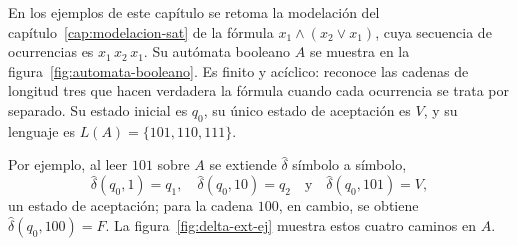 En los ejemplos de este capítulo se retoma la modelación del
capítulo~\ref{cap:modelacion-sat} de la fórmula
$x_1 \wedge (x_2 \vee x_1)$, cuya secuencia de ocurrencias es
$x_1\,x_2\,x_1$. Su autómata booleano $A$ se muestra en la
figura~\ref{fig:automata-booleano}. Es finito y acíclico: reconoce las
cadenas de longitud tres que hacen verdadera la fórmula cuando cada
ocurrencia se trata por separado. Su estado inicial es $q_0$, su único
estado de aceptación es $V$, y su lenguaje es $L(A) = \{101, 110, 111\}$.

Por ejemplo, al leer $101$ sobre $A$ se extiende $\hat\delta$ símbolo a
símbolo,
\[
  \hat\delta(q_0, 1) = q_1, \quad \hat\delta(q_0, 10) = q_2 \quad\text{y}\quad
  \hat\delta(q_0, 101) = V,
\]
un estado de aceptación; para la cadena $100$, en cambio, se obtiene
$\hat\delta(q_0, 100) = F$. La figura~\ref{fig:delta-ext-ej} muestra
estos cuatro caminos en $A$.


